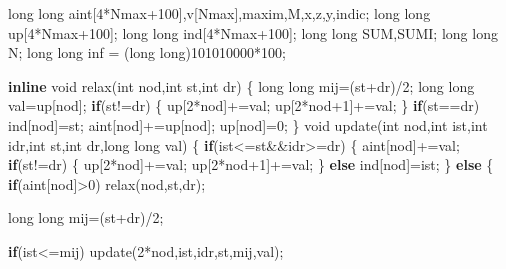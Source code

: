 \documentclass[10pt,]{article}
\newenvironment{Shaded}{}{}
\newcommand{\KeywordTok}[1]{\textcolor[rgb]{0.00,0.44,0.13}{\textbf{{#1}}}}
\newcommand{\DataTypeTok}[1]{\textcolor[rgb]{0.56,0.13,0.00}{{#1}}}
\newcommand{\DecValTok}[1]{\textcolor[rgb]{0.25,0.63,0.44}{{#1}}}
\newcommand{\NormalTok}[1]{{#1}}
\begin{document}
\begin{Shaded}
\begin{Highlighting}[]
\DataTypeTok{long} \DataTypeTok{long} \NormalTok{aint[}\DecValTok{4}\NormalTok{*Nmax}\DecValTok{+100}\NormalTok{],v[Nmax],maxim,M,x,z,y,indic;}
\DataTypeTok{long} \DataTypeTok{long} \NormalTok{up[}\DecValTok{4}\NormalTok{*Nmax}\DecValTok{+100}\NormalTok{];}
\DataTypeTok{long} \DataTypeTok{long} \NormalTok{ind[}\DecValTok{4}\NormalTok{*Nmax}\DecValTok{+100}\NormalTok{];}
\DataTypeTok{long} \DataTypeTok{long} \NormalTok{SUM,SUMI;}
\DataTypeTok{long} \DataTypeTok{long} \NormalTok{N;}
\DataTypeTok{long} \DataTypeTok{long} \NormalTok{inf = (}\DataTypeTok{long} \DataTypeTok{long}\NormalTok{)}\DecValTok{101010000}\NormalTok{*}\DecValTok{100}\NormalTok{;}

\KeywordTok{inline} \DataTypeTok{void} \NormalTok{relax(}\DataTypeTok{int} \NormalTok{nod,}\DataTypeTok{int} \NormalTok{st,}\DataTypeTok{int} \NormalTok{dr)}
\NormalTok{\{}
  \DataTypeTok{long} \DataTypeTok{long} \NormalTok{mij=(st+dr)/}\DecValTok{2}\NormalTok{;}
  \DataTypeTok{long} \DataTypeTok{long} \NormalTok{val=up[nod];}
  \KeywordTok{if}\NormalTok{(st!=dr)}
  \NormalTok{\{}
    \NormalTok{up[}\DecValTok{2}\NormalTok{*nod]+=val;}
    \NormalTok{up[}\DecValTok{2}\NormalTok{*nod}\DecValTok{+1}\NormalTok{]+=val;}
  \NormalTok{\}}
  \KeywordTok{if}\NormalTok{(st==dr)}
    \NormalTok{ind[nod]=st;}
  \NormalTok{aint[nod]+=up[nod];}
  \NormalTok{up[nod]=}\DecValTok{0}\NormalTok{;}
\NormalTok{\}}
\DataTypeTok{void} \NormalTok{update(}\DataTypeTok{int} \NormalTok{nod,}\DataTypeTok{int} \NormalTok{ist,}\DataTypeTok{int} \NormalTok{idr,}\DataTypeTok{int} \NormalTok{st,}\DataTypeTok{int} \NormalTok{dr,}\DataTypeTok{long} \DataTypeTok{long} \NormalTok{val)}
\NormalTok{\{}
  \KeywordTok{if}\NormalTok{(ist<=st&&idr>=dr)}
  \NormalTok{\{}
    \NormalTok{aint[nod]+=val;}
    \KeywordTok{if}\NormalTok{(st!=dr)}
    \NormalTok{\{}
    \NormalTok{up[}\DecValTok{2}\NormalTok{*nod]+=val;}
    \NormalTok{up[}\DecValTok{2}\NormalTok{*nod}\DecValTok{+1}\NormalTok{]+=val;}
    \NormalTok{\}}
    \KeywordTok{else} \NormalTok{ind[nod]=ist;}
  \NormalTok{\}}
  \KeywordTok{else}
  \NormalTok{\{}
    \KeywordTok{if}\NormalTok{(aint[nod]>}\DecValTok{0}\NormalTok{)}
      \NormalTok{relax(nod,st,dr);}

    \DataTypeTok{long} \DataTypeTok{long} \NormalTok{mij=(st+dr)/}\DecValTok{2}\NormalTok{;}

    \KeywordTok{if}\NormalTok{(ist<=mij)}
      \NormalTok{update(}\DecValTok{2}\NormalTok{*nod,ist,idr,st,mij,val);}


\end{Highlighting}
\end{Shaded}
\end{document}
